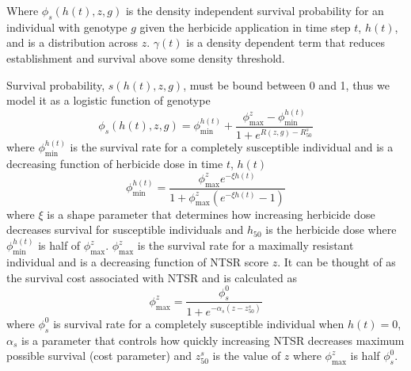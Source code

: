 \documentclass[12pt, a4paper]{article}
\begin{document}
Where $\phi_s(h(t), z, g)$ is the density independent survival probability for an individual with genotype $g$ given the herbicide application in time step $t$, $h(t)$, and is a distribution across $z$. $\gamma(t)$ is a density dependent term that reduces establishment and survival above some density threshold.  

Survival probability, $s(h(t), z, g)$, must be bound between 0 and 1, thus we model it as a logistic function of genotype     
\begin{equation}\label{eq:herb_surv}
	\phi_s(h(t), z, g) =	\phi_\text{min}^{h(t)} + \frac{\phi_\text{max}^z - \phi_\text{min}^{h(t)}}{1 + e^{R(z, g) - R_{50}^s}}	
\end{equation}
where $\phi_\text{min}^{h(t)}$ is the survival rate for a completely susceptible individual and is a decreasing function of herbicide dose in time $t$, $h(t)$ 
\begin{equation}\label{eq:dose_response}
	\phi_\text{min}^{h(t)} = \frac{\phi_\text{max}^z e^{-\xi h(t)}}{1 + \phi_\text{max}^z(e^{-\xi h(t)} - 1)}
\end{equation}
where $\xi$ is a shape parameter that determines how increasing herbicide dose decreases survival for susceptible individuals and $h_{50}$ is the herbicide dose where $\phi_\text{min}^{h(t)}$ is half of $\phi_\text{max}^z$. $\phi_\text{max}^z$ is the survival rate for a maximally resistant individual and is a decreasing function of NTSR score $z$. It can be thought of as the survival cost associated with NTSR and is calculated as 
\begin{equation}\label{eq:surv_cost}
	\phi_\text{max}^z = \frac{\phi_s^0}{1 + e^{-\alpha_s(z - z_{50}^s)}} 
\end{equation}
where $\phi_s^0$ is survival rate for a completely susceptible individual when $h(t) = 0$, $\alpha_s$ is a parameter that controls how quickly increasing NTSR decreases maximum possible survival (cost parameter) and $z_{50}^s$ is the value of $z$ where $\phi_\text{max}^z$ is half $\phi_s^0$.       
\end{document}
